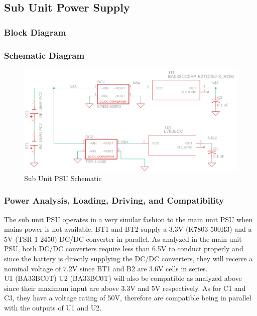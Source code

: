\subsection{Sub Unit Power Supply}
\subsubsection{Block Diagram}
\subsubsection{Schematic Diagram}
\begin{landscape}
  \begin{center}
  \begin{figure}[H]
    \includegraphics[width=1.6\textwidth, left]{../Modular Design/Sub-Unit-PSU/Figures/sub-unit-psu.png}
    \caption{Sub Unit PSU Schematic}
    \label{fig:sub-psu-schematic}
  \end{figure}
  \end{center}
\end{landscape}
\subsubsection{Power Analysis, Loading, Driving, and Compatibility}
The sub unit PSU operates in a very similar fashion to the main unit PSU when mains power is not available. BT1 and BT2 supply a 3.3\si{\V} (K7803-500R3) \cite{K7803500R3} and a 5\si{\V} (TSR 1-2450) \cite{TSR12450} DC/DC converter in parallel. As analyzed in the main unit PSU, both DC/DC converters require less than 6.5\si{\V} to conduct properly and since the battery is directly supplying the DC/DC converters, they will receive a nominal voltage of 7.2\si{\V} since BT1 and B2 are 3.6\si{\V} cells in series.\\ U1 (BA33BC0T) \cite{BA33BC0T} U2 (BA33BC0T) will also be compatible as analyzed above since their maximum input are above 3.3\si{\V} and 5\si{\V} respectively. As for C1 and C3, they have a voltage rating of 50\si{\V}, therefore are compatible being in parallel with the outputs of U1 and U2.

